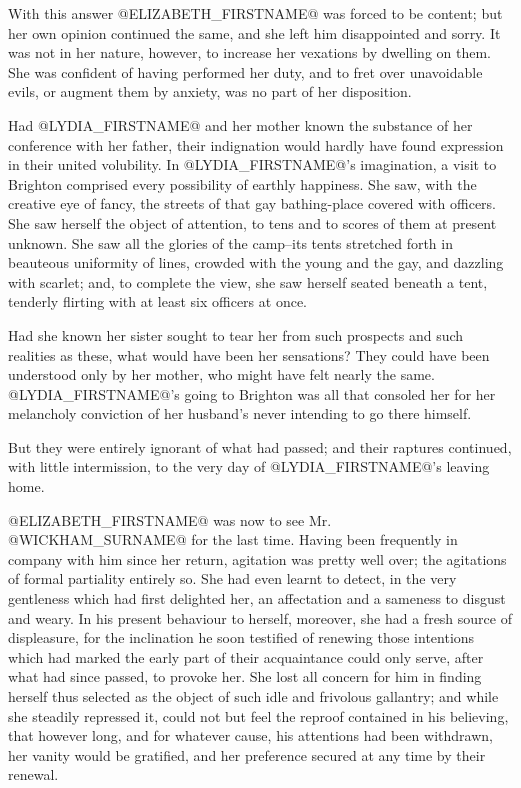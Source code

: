 With this answer @ELIZABETH_FIRSTNAME@ was forced to be content; but her own opinion
continued the same, and she left him disappointed and sorry. It was not
in her nature, however, to increase her vexations by dwelling on
them. She was confident of having performed her duty, and to fret
over unavoidable evils, or augment them by anxiety, was no part of her
disposition.

Had @LYDIA_FIRSTNAME@ and her mother known the substance of her conference with her
father, their indignation would hardly have found expression in their
united volubility. In @LYDIA_FIRSTNAME@'s imagination, a visit to Brighton comprised
every possibility of earthly happiness. She saw, with the creative eye
of fancy, the streets of that gay bathing-place covered with officers.
She saw herself the object of attention, to tens and to scores of them
at present unknown. She saw all the glories of the camp--its tents
stretched forth in beauteous uniformity of lines, crowded with the young
and the gay, and dazzling with scarlet; and, to complete the view, she
saw herself seated beneath a tent, tenderly flirting with at least six
officers at once.

Had she known her sister sought to tear her from such prospects and such
realities as these, what would have been her sensations? They could have
been understood only by her mother, who might have felt nearly the same.
@LYDIA_FIRSTNAME@'s going to Brighton was all that consoled her for her melancholy
conviction of her husband's never intending to go there himself.

But they were entirely ignorant of what had passed; and their raptures
continued, with little intermission, to the very day of @LYDIA_FIRSTNAME@'s leaving
home.

@ELIZABETH_FIRSTNAME@ was now to see Mr. @WICKHAM_SURNAME@ for the last time. Having been
frequently in company with him since her return, agitation was pretty
well over; the agitations of formal partiality entirely so. She had even
learnt to detect, in the very gentleness which had first delighted
her, an affectation and a sameness to disgust and weary. In his present
behaviour to herself, moreover, she had a fresh source of displeasure,
for the inclination he soon testified of renewing those intentions which
had marked the early part of their acquaintance could only serve, after
what had since passed, to provoke her. She lost all concern for him in
finding herself thus selected as the object of such idle and frivolous
gallantry; and while she steadily repressed it, could not but feel the
reproof contained in his believing, that however long, and for whatever
cause, his attentions had been withdrawn, her vanity would be gratified,
and her preference secured at any time by their renewal.

